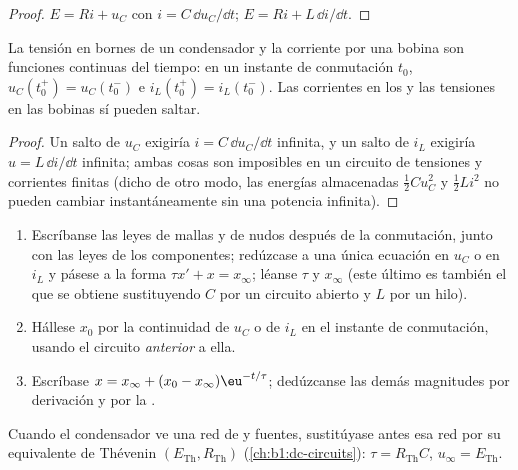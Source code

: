 \begin{proof}
 $E = Ri + u_C$ con $i = C\,\dd u_C/\dd t$;  $E = Ri + L\,\dd i/\dd t$.
\end{proof}

\begin{proposition}\label{prop:b1:transient-regimes:continuity}
La tensión en bornes de un condensador y la corriente por una bobina son
funciones continuas del tiempo: en un instante de conmutación $t_0$,
$u_C(t_0^+) = u_C(t_0^-)$ e $i_L(t_0^+) = i_L(t_0^-)$. Las corrientes en
los  y las tensiones en las bobinas sí pueden saltar.
\end{proposition}

\begin{proof}
Un salto de $u_C$ exigiría $i = C\,\dd u_C/\dd t$ infinita, y un salto de
$i_L$ exigiría $u = L\,\dd i/\dd t$ infinita; ambas cosas son imposibles
en un circuito de tensiones y corrientes finitas (dicho de otro modo, las
energías almacenadas $\tfrac12 Cu_C^2$ y $\tfrac12 Li^2$ no pueden cambiar
instantáneamente sin una potencia infinita).
\end{proof}

\begin{method}\label{met:b1:transient-regimes:first}
\begin{enumerate}
  \item Escríbanse las leyes de mallas y de nudos después de la
        conmutación, junto con las leyes de los componentes; redúzcase a
        una única ecuación en $u_C$ o en $i_L$ y pásese a la forma
        $\tau x' + x = x_\infty$; léanse $\tau$ y $x_\infty$ (este último
        es también el  que se obtiene sustituyendo $C$
        por un circuito abierto y $L$ por un hilo).
  \item Hállese $x_0$ por la continuidad de $u_C$ o de $i_L$ en el
        instante de conmutación, usando el circuito \emph{anterior} a ella.
  \item Escríbase $x = x_\infty + (x_0 - x_\infty)\eu^{-t/\tau}$; dedúzcanse
        las demás magnitudes por derivación y por la .
\end{enumerate}
Cuando el condensador ve una red de  y fuentes, sustitúyase
antes esa red por su equivalente de Thévenin $(E_{\mathrm{Th}}, R_{\mathrm{Th}})$
(\cref{ch:b1:dc-circuits}): $\tau = R_{\mathrm{Th}}C$,
$u_\infty = E_{\mathrm{Th}}$.
\end{method}

